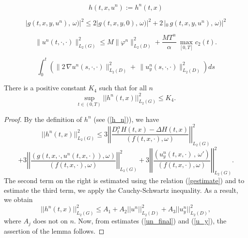 \documentclass[10pt,a4paper]{amsart}
\begin{document}
\begin{equation}\label{h_n}
   h(t, x, u^n) := h^n(t, x)
    \end{equation}

\begin{equation}\label{gestimate}
    |g(t,x,y, u^n),\, \omega)|^2\leq 2 | g(t,x,y, 0),\, \omega)|^2 + 2\, | _0\, g(t,x,y, u^n),\, \omega)|^2 
\end{equation}

\begin{equation}\label{un_final}
    \| u^n(t, \cdot, \cdot) \|_{L_2(G)}^2\leq M\| \varphi^n \|_{L_2(D)}^2  + \frac{MT^\alpha}{\alpha} \,\max_{[0,T]}c_{2}(t) .
\end{equation}

\begin{equation}\label{u_y}
 \int_0^t \left(\| 2 \, \nabla u^n (s, \cdot, \cdot)\|_{L_2(D)}^2 +  \, \| u^n_y (s, \cdot, \cdot) \|_{L_2(D)}^2 \right) ds     
 \end{equation}

\begin{lem}\label{hestimatelemma} There is a positive constant $K_4$ such that for all $n$
\begin{equation}\label{hestimate}
 \sup_{t\in(0, T)} ||h^n(t, x)||_{L_2(G)}^2
    \leq K_4.  
\end{equation}
\end{lem}

\begin{proof}
By the definition of $h^n$ (see (\ref{h_n})), we have
\[
||h^n(t, x)||_{L_2(G)}^2
    \leq  3\left|\left|\frac{D_t^{\alpha} H(t, x) -\Delta H(t, x)}{(f(t, x, \cdot), \omega)}\right|\right|_{L_2(G)}^2
\]
\begin{equation}\label{hestimate2}
    + 3\left|\left|\frac{(g(t, x, \cdot, u^n(t,x, \cdot)), \omega)}{(f(t, x, \cdot), \omega)}\right|\right|_{L_2(G)}^2 + 3\left|\left|\frac{(u^n_y(t,x, \cdot)\, , \, \omega')}{(f(t, x, \cdot), \omega)}\right|\right|_{L_2(G)}^2.
\end{equation}
The second term on the right is estimated using the relation (\ref{gestimate}) and to estimate the third term, we apply the Cauchy-Schwartz inequality. As a result, we obtain
\[
||h^n(t, x)||_{L_2(G)}^2
    \leq A_1 + A_2 ||u^n||_{L_2(D)}^2 + A_3 ||u_y^n||_{L_2(D)}^2,
    \]
where $A_j$ does not on $n$. Now, from estimates (\ref{un_final}) and (\ref{u_y}), the assertion of the lemma follows. \end{proof}
\end{document}

